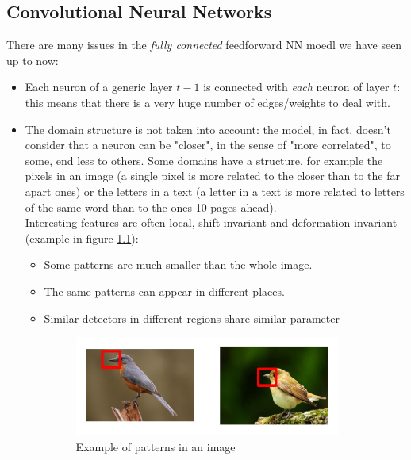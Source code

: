 \documentclass[12pt]{report}
\theoremstyle{plain}
\begin{document}
\begin{flushleft}
\chapter{Convolutional Neural Networks}

There are many issues in the \textit{fully connected} feedforward NN moedl we have seen up to now:
\begin{itemize}
	\item Each neuron of a generic layer $t-1$ is connected with \textit{each} neuron of layer $t$: this means that there is a very huge number of edges/weights to deal with.
	\item The domain structure is not taken into account: the model, in fact, doesn't consider that a neuron can be "closer", in the sense of "more correlated", to some, end less to others. Some domains have a structure, for example the pixels in an image (a single pixel is more related to the closer than to the far apart ones) or the letters in a text (a letter in a text is more related to letters of the same word than to the ones 10 pages ahead).\\
	Interesting features are often local, shift-invariant and deformation-invariant (example in figure \ref{fig:convNN_beaks}):
		\begin{itemize}
		\item Some patterns are much smaller than the whole image.
		\item The same patterns can appear in different places.
		\item Similar detectors in different regions share similar parameter
		\begin{figure}[!h]
			\centering
			\includegraphics[scale=1.4]{images/convNN_beaks.pdf}
			\caption{Example of patterns in an image}
			\label{fig:convNN_beaks}
		\end{figure}
	\end{itemize}
\end{itemize}    


\end{flushleft}
\end{document}
